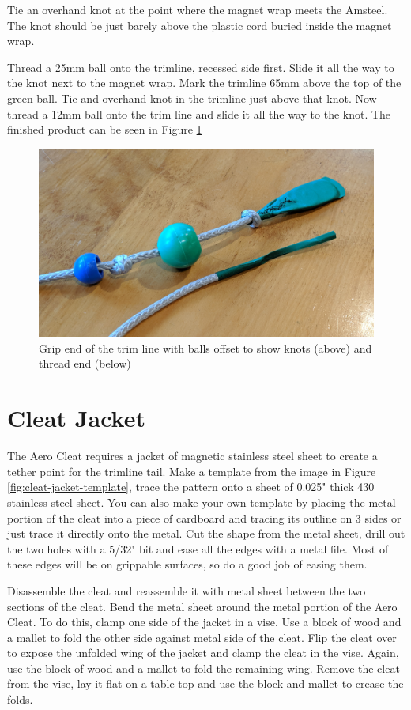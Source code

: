 \documentclass[]{book}
\begin{document}
Tie an overhand knot at the point where the magnet wrap meets the Amsteel. The knot should be just barely above the plastic cord buried inside the magnet wrap.

Thread a 25mm ball onto the trimline, recessed side first. Slide it all the way to the knot next to the magnet wrap. Mark the trimline 65mm above the top of the green ball. Tie and overhand knot in the trimline just above that knot. Now thread a 12mm ball onto the trim line and slide it all the way to the knot. The finished product can be seen in Figure \ref{fig:finished-end}

\begin{figure}

{\centering \includegraphics[width=0.7\linewidth]{images/finished_end_of_trimline} 

}

\caption{Grip end of the trim line with balls offset to show knots (above) and thread end (below)}\label{fig:finished-end}
\end{figure}

\hypertarget{cleat-jacket}{%
\section{Cleat Jacket}\label{cleat-jacket}}

The Aero Cleat requires a jacket of magnetic stainless steel sheet to create a tether point for the trimline tail. Make a template from the image in Figure \ref{fig:cleat-jacket-template}, trace the pattern onto a sheet of 0.025" thick 430 stainless steel sheet. You can also make your own template by placing the metal portion of the cleat into a piece of cardboard and tracing its outline on 3 sides or just trace it directly onto the metal. Cut the shape from the metal sheet, drill out the two holes with a 5/32" bit and ease all the edges with a metal file. Most of these edges will be on grippable surfaces, so do a good job of easing them.

Disassemble the cleat and reassemble it with metal sheet between the two sections of the cleat. Bend the metal sheet around the metal portion of the Aero Cleat. To do this, clamp one side of the jacket in a vise. Use a block of wood and a mallet to fold the other side against metal side of the cleat. Flip the cleat over to expose the unfolded wing of the jacket and clamp the cleat in the vise. Again, use the block of wood and a mallet to fold the remaining wing. Remove the cleat from the vise, lay it flat on a table top and use the block and mallet to crease the folds.
\end{document}
